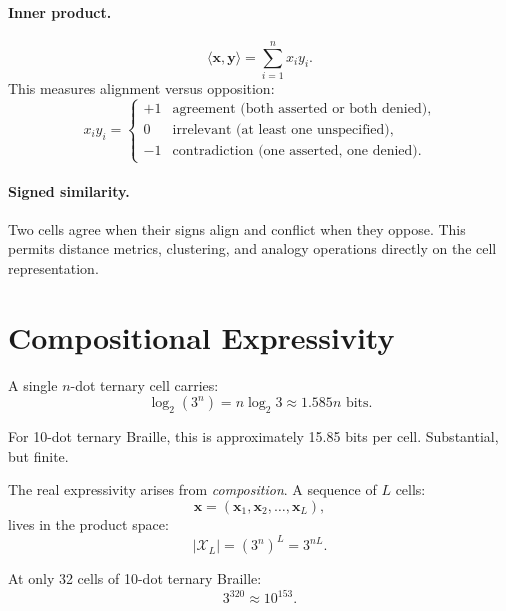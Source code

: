 \documentclass[11pt,a4paper]{article}
\newcommand{\X}{\mathcal{X}}
\newcommand{\xvec}{\bm{x}}
\newcommand{\yvec}{\bm{y}}
\begin{document}
\paragraph{Inner product.}
\begin{equation}
  \langle \xvec, \yvec \rangle = \sum_{i=1}^{n} x_i y_i.
\end{equation}
This measures alignment versus opposition:
\begin{equation}
  x_i y_i =
  \begin{cases}
    +1 & \text{agreement (both asserted or both denied)}, \\
    0  & \text{irrelevant (at least one unspecified)}, \\
    -1 & \text{contradiction (one asserted, one denied)}.
  \end{cases}
\end{equation}

\paragraph{Signed similarity.}
Two cells agree when their signs align and conflict when they oppose.
This permits distance metrics, clustering, and analogy operations
directly on the cell representation.

\section{Compositional Expressivity}
\label{sec:composition}

A single $n$-dot ternary cell carries:
\begin{equation}
  \log_2(3^n) = n \log_2 3 \approx 1.585n \text{ bits}.
\end{equation}

For 10-dot ternary Braille, this is approximately 15.85 bits per cell.
Substantial, but finite.

The real expressivity arises from \emph{composition}.
A sequence of $L$ cells:
\begin{equation}
  \xvec = (\xvec_1, \xvec_2, \ldots, \xvec_L),
\end{equation}
lives in the product space:
\begin{equation}
  |\X_L| = (3^n)^L = 3^{nL}.
\end{equation}

At only 32 cells of 10-dot ternary Braille:
\begin{equation}
  3^{320} \approx 10^{153}.
\end{equation}
\end{document}
